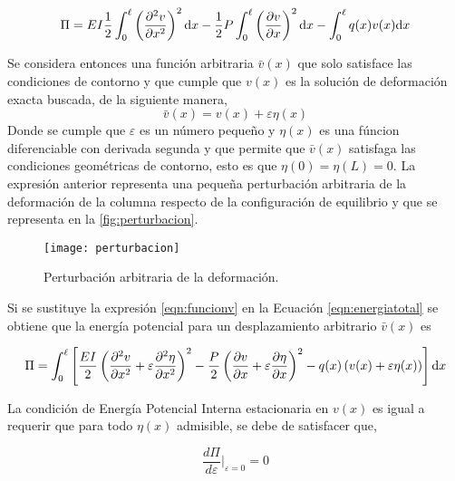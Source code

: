 \begin{equation}\label{eqn:energiatotal}
\Pi = E I \frac{1}{2} \int_0^\ell \left( \frac{\partial^2 v}{\partial x^2}\right)^2 {\text{d}} x -\frac{1}{2} P \int_0^\ell  \left(\frac{\partial v}{\partial x}\right)^2 {\text{d}} x - \int_0^\ell q(x) v(x) {\text{d}} x
\end{equation}

Se considera entonces una función arbitraria $\bar{v}(x)$ que solo satisface las condiciones de contorno y que cumple que $v(x)$ es la solución de deformación exacta buscada, de la siguiente manera,
\begin{equation}\label{eqn:funcionv}
\bar{v}(x)=v(x)+\varepsilon\eta(x)
\end{equation}
Donde se cumple que $\varepsilon$ es un número pequeño y $\eta(x)$ es una fúncion diferenciable con derivada segunda y que permite que $\bar{v}(x)$ satisfaga las condiciones geométricas de contorno, esto es que $\eta(0)=\eta(L)=0$.
La expresión anterior representa una pequeña perturbación arbitraria de la deformación de la columna respecto de la configuración de equilibrio y que se representa en la \autoref{fig:perturbacion}.

\begin{figure}[htb]
	\centering
	\texttt{[image: perturbacion]}
	\caption{Perturbación arbitraria de la deformación.}
	\label{fig:perturbacion}
\end{figure}

Si se sustituye la expresión \eqref{eqn:funcionv} en la Ecuación \eqref{eqn:energiatotal} se obtiene que la energía potencial para un desplazamiento arbitrario $\bar{v}(x)$ es

\begin{equation}\label{eqn:energiatotal2}
\Pi = \int_0^\ell \left[ \frac{EI}{2} \left( \frac{\partial^2 v}{\partial x^2} + \varepsilon\frac{\partial^2 \eta}{\partial x^2} \right)^2 - \frac{P}{2} \left(\frac{\partial v}{\partial x} + \varepsilon\frac{\partial \eta}{\partial x}\right)^2- q(x) \left( v(x)+\varepsilon\eta(x)\right) \right] {\text{d}} x
\end{equation}

La condición de Energía Potencial Interna estacionaria en $v(x)$ es igual a requerir que para todo $\eta(x)$ admisible, se debe de satisfacer que,

\begin{equation}
\frac{d\Pi}{d\varepsilon} \Bigg|_{\varepsilon=0} = 0
\end{equation}

